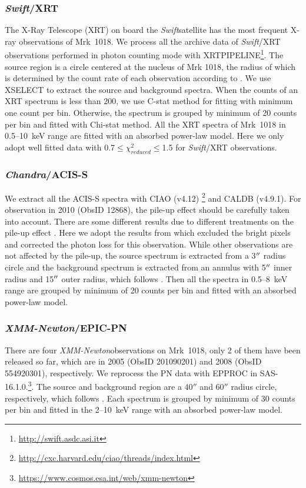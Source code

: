 \documentclass[twocolumn]{aastex63}
\newcommand{\xmm}{{\em XMM-Newton}}
\newcommand{\chandra}{{\em Chandra}}
\newcommand{\swift}{{\small \it Swift}}
\begin{document}
\subsubsection{\swift/XRT}
The X-Ray Telescope (XRT) on board the \swift satellite has the most frequent X-ray observations of Mrk~1018. We process all the archive data of \swift/XRT observations performed in photon counting mode with {\scriptsize XRTPIPELINE}\footnote{\url{http://swift.asdc.asi.it}}. The source region is a circle centered at the nucleus of Mrk 1018, the radius of which is determined by the count rate of each observation according to \citet{2009MNRAS.397.1177E}. We use {\scriptsize XSELECT} to extract the source and background spectra. When the counts of an XRT spectrum is less than 200, we use C-stat method for fitting with minimum one count per bin. Otherwise, the spectrum is grouped by minimum of 20 counts per bin and fitted with Chi-stat method. All the XRT spectra of Mrk~1018 in 0.5--10~keV range are fitted with an absorbed power-law model. Here we only adopt well fitted data with 0.7$\le \chi^2_{reduced} \le$1.5 for \swift/XRT observations. 


\subsubsection{\chandra/ACIS-S}
We extract all the ACIS-S spectra with CIAO (v4.12) \footnote{\url{http://cxc.harvard.edu/ciao/threads/index.html}} and {\scriptsize CALDB} (v4.9.1).  For observation in 2010 (ObsID 12868), the pile-up effect should be carefully taken into account. There are some different results due to different treatments on the pile-up effect \citep[see ][]{2017ApJ...840...11L,2017A&A...607L...9K}. Here we adopt the results from \citet{2016A&A...593L...9H} which excluded the bright pixels and  corrected the photon loss for this observation. While other observations are not affected by the pile-up, the source spectrum is extracted from a 3$\mbox{$^{\prime\prime}$}$ radius circle and the background spectrum is extracted from an annulus with 5$\mbox{$^{\prime\prime}$}$ inner radius and 15$\mbox{$^{\prime\prime}$}$ outer radius, which follows \citet{2017ApJ...840...11L}. Then all the spectra in 0.5--8~keV range are grouped by minimum of 20 counts per bin and fitted with an absorbed power-law model. 



\subsubsection{\xmm/EPIC-PN}
There are four \xmm observations on Mrk~1018, only 2 of them have been released so far, which are in 2005 (ObsID 201090201) and 2008 (ObsID 554920301), respectively. We reprocess the PN data with {\scriptsize EPPROC} in SAS-16.1.0.\footnote{\url{https://www.cosmos.esa.int/web/xmm-newton}}. The source and background region are a 40$''$ and 60$''$ radius circle, respectively, which follows \citet{2018MNRAS.480.3898N}. Each spectrum is grouped by minimum of 30 counts per bin and fitted in the 2--10~keV range with an absorbed power-law model. 
\end{document}
